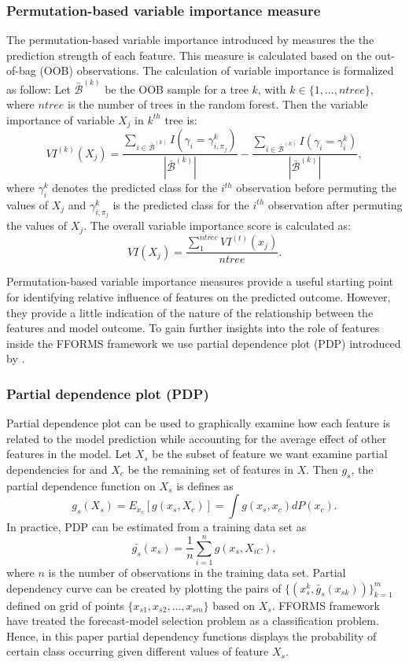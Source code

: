 \documentclass[11pt,a4paper,]{article}
\begin{document}
\subsubsection{Permutation-based variable importance
measure}\label{permutation-based-variable-importance-measure}

The permutation-based variable importance introduced by
\textcite{breiman2001random} measures the the prediction strength of
each feature. This measure is calculated based on the out-of-bag (OOB)
observations. The calculation of variable importance is formalized as
follow: Let \(\bar{\mathcal{B}}^{(k)}\) be the OOB sample for a tree
\(k\), with \(k\in \{1,...,ntree\}\), where \(ntree\) is the number of
trees in the random forest. Then the variable importance of variable
\(X_{j}\) in \(k^{th}\) tree is:
\[VI^{(k)}(X_{j})=\frac{\sum_{i\in \bar{\mathcal{B}}^{(k)}}I(\gamma_{i}=\gamma_{i,\pi_{j}}^{k})}{|\bar{\mathcal{B}}^{(k)}|}-\frac{\sum_{i\in \bar{\mathcal{B}}^{(k)}}I(\gamma_{i}=\gamma_{i}^{k})}{|\bar{\mathcal{B}}^{(k)}|},\]
where \(\gamma_{i}^{k}\) denotes the predicted class for the \(i^{th}\)
observation before permuting the values of \(X_{j}\) and
\(\gamma_{i, \pi_{j}}^{k}\) is the predicted class for the \(i^{th}\)
observation after permuting the values of \(X_{j}\). The overall
variable importance score is calculated as:
\[VI(X_{j})=\frac{\sum_{1}^{ntree}VI^{(t)}(x_{j})}{ntree}.\]

Permutation-based variable importance measures provide a useful starting
point for identifying relative influence of features on the predicted
outcome. However, they provide a little indication of the nature of the
relationship between the features and model outcome. To gain further
insights into the role of features inside the FFORMS framework we use
partial dependence plot (PDP) introduced by
\textcite{friedman2008predictive}.

\subsubsection{Partial dependence plot
(PDP)}\label{partial-dependence-plot-pdp}

Partial dependence plot can be used to graphically examine how each
feature is related to the model prediction while accounting for the
average effect of other features in the model. Let \(X_s\) be the subset
of feature we want examine partial dependencies for and \(X_c\) be the
remaining set of features in \(X\). Then \(g_s\), the partial dependence
function on \(X_s\) is defines as
\[g_s(X_s)=E_{x_c}[g(x_s, X_c)]=\int{g(x_s, x_c)dP(x_c).}\] In practice,
PDP can be estimated from a training data set as
\[\bar{g_s}(x_s)=\frac{1}{n}\sum_{i=1}^{n}g(x_s, X_{iC}),\] where \(n\)
is the number of observations in the training data set. Partial
dependency curve can be created by plotting the pairs of
\(\{(x_s^k, \bar{g}_s(x_{sk}))\}_{k=1}^{m}\) defined on grid of points
\(\{x_{s1}, x_{s2},\dots, x_{sm}\}\) based on \(X_s\). FFORMS framework
have treated the forecast-model selection problem as a classification
problem. Hence, in this paper partial dependency functions displays the
probability of certain class occurring given different values of feature
\(X_s\).
\end{document}
